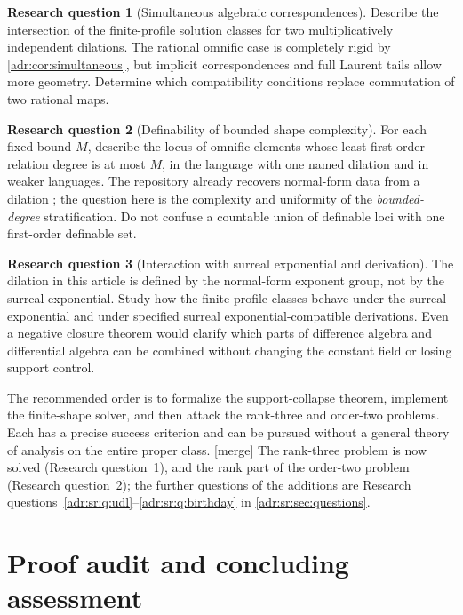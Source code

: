 \documentclass[11pt,letterpaper]{article}
\numberwithin{equation}{section}
\theoremstyle{definition}
\newtheorem{question}{Research question}
\theoremstyle{remark}
\newcommand{\mtag}{\textup{[merge]}}%
\begin{document}
\begin{question}[Simultaneous algebraic correspondences]
Describe the intersection of the finite-profile solution classes for two
multiplicatively independent dilations. The rational omnific case is
completely rigid by \cref{adr:cor:simultaneous}, but implicit correspondences
and full Laurent tails allow more geometry. Determine which compatibility
conditions replace commutation of two rational maps.
\end{question}

\begin{question}[Definability of bounded shape complexity]
For each fixed bound $M$, describe the locus of omnific elements whose
least first-order relation degree is at most $M$, in the language with
one named dilation and in weaker languages. The repository already
recovers normal-form data from a dilation \cite{RepoDilation}; the
question here is the complexity and uniformity of the \emph{bounded-degree}
stratification. Do not confuse a countable union of definable loci with
one first-order definable set.
\end{question}

\begin{question}[Interaction with surreal exponential and derivation]
The dilation in this article is defined by the normal-form exponent group,
not by the surreal exponential. Study how the finite-profile classes
behave under the surreal exponential and under specified surreal
exponential-compatible derivations. Even a negative closure theorem would
clarify which parts of difference algebra and differential algebra can be
combined without changing the constant field or losing support control.
\end{question}

The recommended order is to formalize the support-collapse theorem,
implement the finite-shape solver, and then attack the rank-three and
order-two problems. Each has a precise success criterion and can be
pursued without a general theory of analysis on the entire proper class.
\mtag{} The rank-three problem is now solved (Research question~1), and the
rank part of the order-two problem (Research question~2); the further
questions of the additions are
Research questions~\ref{adr:sr:q:udl}--\ref{adr:sr:q:birthday}
in \cref{adr:sr:sec:questions}.

\section{Proof audit and concluding assessment}\label{adr:sec:audit}
\end{document}
